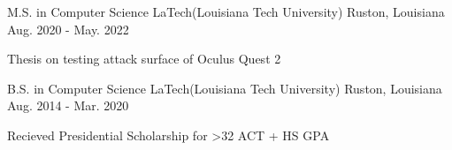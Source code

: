 

\begin{cventries}

  \cventry
    {M.S. in Computer Science} %
    {LaTech(Louisiana Tech University)} %
    {Ruston, Louisiana} %
    {Aug. 2020 - May. 2022} %
    {
      \begin{cvitems} %
        \item {Thesis on testing attack surface of Oculus Quest 2}
      \end{cvitems}
    }


  \cventry
    {B.S. in Computer Science} %
    {LaTech(Louisiana Tech University)} %
    {Ruston, Louisiana} %
    {Aug. 2014 - Mar. 2020} %
    {
      \begin{cvitems} %
        \item {Recieved Presidential Scholarship for >32 ACT + HS GPA}
      \end{cvitems}
    }

\end{cventries}
